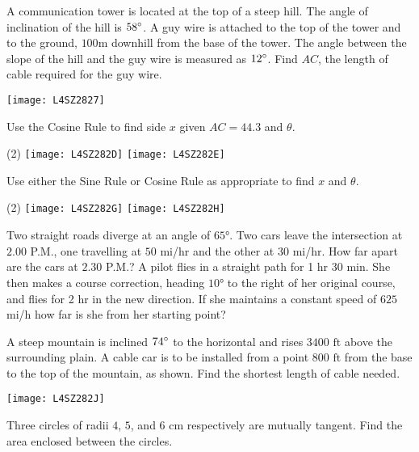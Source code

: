 \begin{Exercise}[title={Applications},label=exApplications]
\begin{multicols}{2}
	\Question A communication tower is located at the top of a steep hill. The angle of inclination
	of the hill is $58 \mbox{{\ensuremath{{}^\circ}}}$. A guy wire is attached to the top of the tower and to the ground, $100 \mbox{m}$ downhill from the base of the tower. The angle between the slope of the hill and the guy wire is measured as $12 \mbox{{\ensuremath{{}^\circ}}}$. Find $A C$, the length of cable required for the guy wire. %
	\columnbreak 
	
	\texttt{[image: L4SZ2827]}	\\
\end{multicols}	
\clearpage
\Question Use the Cosine Rule to find side $x$ given $AC=44.3$ and $\theta$. 
\begin{tasks}(2)
	\task 	\texttt{[image: L4SZ282D]}%
	\task 	\texttt{[image: L4SZ282E]}%
\end{tasks}
\Question Use either the Sine Rule or Cosine Rule as appropriate to find $x$ and $\theta$.
	\begin{tasks}(2)
		\task 	\texttt{[image: L4SZ282G]}%
		\task 	\texttt{[image: L4SZ282H]}%
	\end{tasks}
\Question Two straight roads diverge at an angle of $\ang{65}$. Two cars leave the intersection at $2.00$ P.M., one travelling at $50$ mi/hr and the other at $30$ mi/hr. How far apart are the cars at $2.30$ P.M.?%
\Question A pilot flies in a straight path for 1 hr 30 min. She then makes a course correction, heading $\ang{10}$ to the right of her original course, and flies for 2 hr in the new direction. If she maintains a constant speed of $625$ mi/h how far is she from her starting point?%

\begin{multicols}{2}
	\Question A steep mountain is inclined $74 \mbox{{\ensuremath{{}^\circ}}}$ to the horizontal and rises $3400 \mbox{ ft}$ above the surrounding plain. A cable car is to be installed from a point $800 \mbox{ ft}$ from the base to the top of the mountain, as shown. Find the shortest length of cable needed.%
	\columnbreak 
	
	\texttt{[image: L4SZ282J]}	\\
\end{multicols}	

\begin{multicols}{2}
	\Question Three circles of radii $4$, $5$, and $6 \mbox{ cm}$ respectively are mutually tangent. Find the area enclosed between the circles.%
	\columnbreak 
	

\end{multicols}
\end{Exercise}
